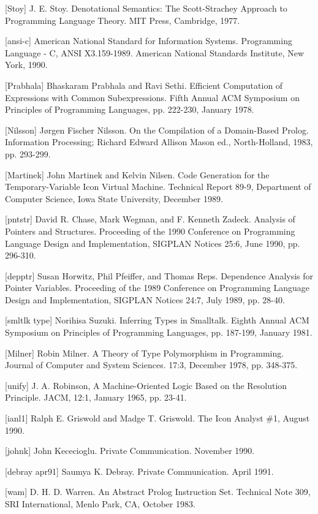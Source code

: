 [Stoy] J. E. Stoy. Denotational Semantics: The Scott-Strachey Approach
to Programming Language Theory. MIT Press, Cambridge, 1977.

[ansi-c] American National Standard for Information
Systems. Programming Language - C, ANSI X3.159-1989. American National
Standards Institute, New York, 1990.

[Prabhala] Bhaskaram Prabhala and Ravi Sethi. Efficient Computation of
Expressions with Common Subexpressions. Fifth Annual ACM Symposium on
Principles of Programming Languages, pp. 222-230, January 1978.

[Nilsson] J{\o}rgen Fischer Nilsson. On the Compilation of a
Domain-Based Prolog. Information Processing; Richard Edward Allison
Mason ed., North-Holland, 1983, pp. 293-299.

[Martinek] John Martinek and Kelvin Nilsen. Code Generation for the
Temporary-Variable Icon Virtual Machine. Technical Report 89-9,
Department of Computer Science, Iowa State University, December 1989.

[pntstr] David R. Chase, Mark Wegman, and F. Kenneth Zadeck. Analysis
of Pointers and Structures. Proceeding of the 1990 Conference on
Programming Language Design and Implementation, SIGPLAN Notices 25:6,
June 1990, pp. 296-310.

[depptr] Susan Horwitz, Phil Pfeiffer, and Thomas Reps. Dependence
Analysis for Pointer Variables. Proceeding of the 1989 Conference on
Programming Language Design and Implementation, SIGPLAN Notices 24:7,
July 1989, pp. 28-40.

[smltlk type] Norihisa Suzuki. Inferring Types in Smalltalk. Eighth
Annual ACM Symposium on Principles of Programming Languages,
pp. 187-199, January 1981.

[Milner] Robin Milner. A Theory of Type Polymorphism in
Programming. Journal of Computer and System Sciences. 17:3, December
1978, pp. 348-375.

[unify] J. A. Robinson, A Machine-Oriented Logic Based on the
Resolution Principle. JACM, 12:1, January 1965, pp.  23-41.

[ianl1] Ralph E. Griswold and Madge T. Griswold. The Icon Analyst \#1,
August 1990.

[johnk] John Kececioglu. Private Communication. November 1990.

[debray apr91] Saumya K. Debray. Private Communication. April 1991.

[wam] D. H. D. Warren. An Abstract Prolog Instruction Set. Technical
Note 309, SRI International, Menlo Park, CA, October 1983.
